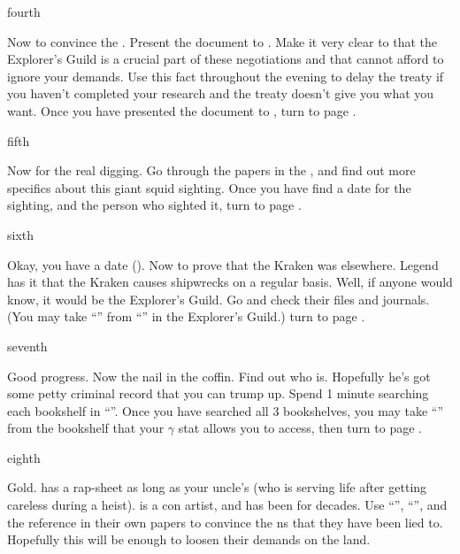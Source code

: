 \documentclass[greennotebook]{NeptuneBall}
\begin{document}
\begin{page}{fourth}

Now to convince the \cKing{\King}. Present the document to \cKing{\King} \cKing{}. Make it very clear to \cKing{\them} that the Explorer's Guild is a crucial part of these negotiations and that \cKing{\they} cannot afford to ignore your demands. Use this fact throughout the evening to delay the treaty if you haven't completed your research and the treaty doesn't give you what you want. Once you have presented the document to \cKing{}, turn to page .

\end{page}

\begin{page}{fifth}

Now for the real digging. Go through the papers in the \sEmbassy{}, and find out more specifics about this giant squid sighting. Once you have find a date for the sighting, and the person who sighted it, turn to page .

\end{page}

\begin{page}{sixth}

Okay, you have a date (\cKraken{\MYname}). Now to prove that the Kraken was elsewhere. Legend has it that the Kraken causes shipwrecks on a regular basis. Well, if anyone would know, it would be the Explorer's Guild. Go and check their files and journals. (You may take ``\iNorthSeasJournal{}'' from ``\sJournals{}'' in the Explorer's Guild.)  turn to page .

\end{page}

\begin{page}{seventh}

Good progress. Now the nail in the coffin. Find out who \cLiar{\MYname} is. Hopefully he's got some petty criminal record that you can trump up. Spend 1 minute searching each bookshelf in ``\sMuseum{}''. Once you have searched all 3 bookshelves, you may take ``\iRapSheet{}'' from the bookshelf that your $\gamma$ stat allows you to access, then turn to page .

\end{page}

\begin{page}{eighth}


Gold. \cLiar{\MYname} has a rap-sheet as long as your uncle's (who is serving life after getting careless during a heist). \cLiar{} is a con artist, and has been for decades. Use ``\iNorthSeasJournal{}'', ``\iRapSheet{}'', and the reference in their own papers to convince the \pPacifica{}ns that they have been lied to. Hopefully this will be enough to loosen their demands on the land.

\end{page}


\endnotebook
\end{document}
